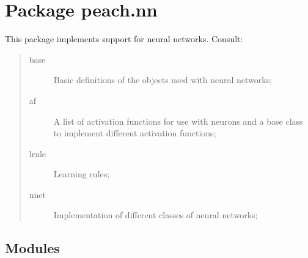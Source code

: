 %
%
%


\section{Package peach.nn}

    \label{peach:nn}

This package implements support for neural networks. Consult:
%
\begin{quote}
%
\begin{description}
\item[{base}] \leavevmode 
Basic definitions of the objects used with neural networks;

\item[{af}] \leavevmode 
A list of activation functions for use with neurons and a base class to
implement different activation functions;

\item[{lrule}] \leavevmode 
Learning rules;

\item[{nnet}] \leavevmode 
Implementation of different classes of neural networks;

\end{description}

\end{quote}


\subsection{Modules}

